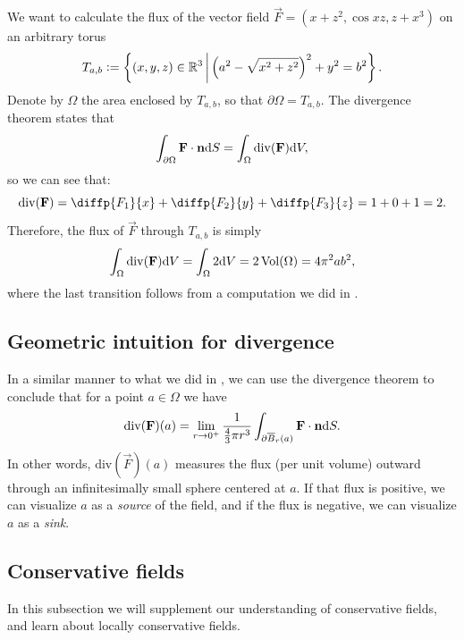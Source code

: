 \documentclass[11pt,a4paper]{article}
\renewcommand{\div}{\mathrm{div}}
\begin{document}
\begin{example}
  We want to calculate the flux of the vector field
  $\vec F = (x + z^2,\cos xz, z + x^3)$ on an arbitrary torus
  \[
    T_{a,b} :=
    \set{(x,y,z) \in \R^3 \bmid \del{a^2 - \sqrt{x^2 + z^2}}^2 + y^2 = b^2}.
  \]
  Denote by $\Omega$ the area enclosed by $T_{a,b}$,
  so that $\partial \Omega = T_{a,b}$.
  The divergence theorem states that
  \[
    \int_{\partial \Omega} \vec F \cdot \vec n \dS =
    \int_{\Omega} \div(\vec F) \dV,
  \]
  so we can see that:
  \[
    \div(\vec F) =
    \diffp{{F_1}}{{x}} +
    \diffp{{F_2}}{{y}} +
    \diffp{{F_3}}{{z}} =
    1 + 0 + 1 = 2.
  \]
  Therefore, the flux of $\vec F$ through $T_{a,b}$ is simply
  \[
    \int_{\Omega} \div(\vec F) \dV =
    \int_{\Omega} 2 \dV =
    2 \Vol(\Omega) =
    4 \pi^2 a b^2,
  \]
  where the last transition follows from a computation
  we did in .
\end{example}

\subsection{Geometric intuition for divergence}
In a similar manner to what we did in ,
we can use the divergence theorem to conclude that
for a point $a \in \Omega$ we have
\[
  \div(\vec F)(a) =
  \lim_{r \to 0^+} \frac{1}{\frac{4}{3} \pi r^3}
  \int_{\partial \overline B_r(a)} \vec F \cdot \vec n \dS.
\]
In other words, $\div(\vec F)(a)$ measures the flux (per unit volume)
outward through an infinitesimally small sphere centered at $a$.
If that flux is positive, we can visualize $a$ as a \textit{source} of
the field, and if the flux is negative,
we can visualize $a$ as a \textit{sink}.

\subsection{Conservative fields}
In this subsection we will supplement our understanding of conservative fields,
and learn about locally conservative fields.
\end{document}
